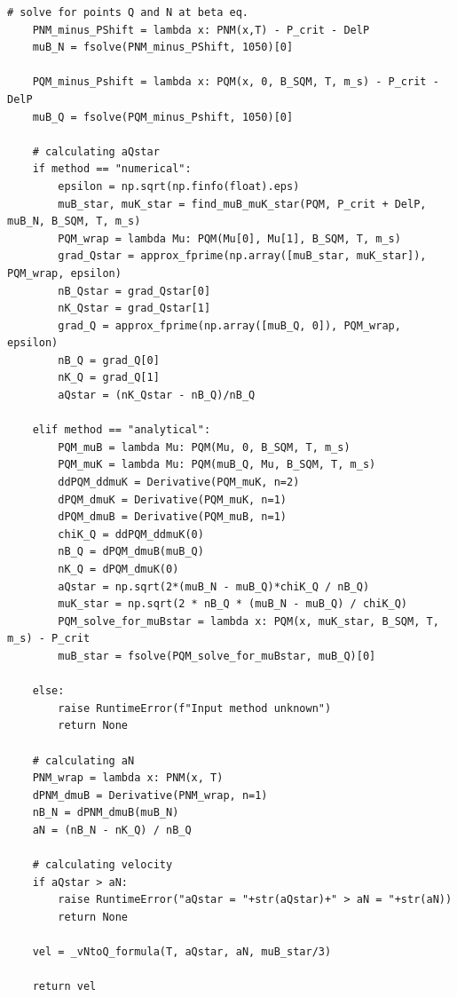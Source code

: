 \documentclass[12pt]{article}
\begin{document}
\begin{lstlisting}[style=mypython]
    # solve for points Q and N at beta eq.
    PNM_minus_PShift = lambda x: PNM(x,T) - P_crit - DelP
    muB_N = fsolve(PNM_minus_PShift, 1050)[0]

    PQM_minus_Pshift = lambda x: PQM(x, 0, B_SQM, T, m_s) - P_crit - DelP
    muB_Q = fsolve(PQM_minus_Pshift, 1050)[0]

    # calculating aQstar
    if method == "numerical":
        epsilon = np.sqrt(np.finfo(float).eps)
        muB_star, muK_star = find_muB_muK_star(PQM, P_crit + DelP, muB_N, B_SQM, T, m_s)
        PQM_wrap = lambda Mu: PQM(Mu[0], Mu[1], B_SQM, T, m_s)
        grad_Qstar = approx_fprime(np.array([muB_star, muK_star]), PQM_wrap, epsilon)
        nB_Qstar = grad_Qstar[0]
        nK_Qstar = grad_Qstar[1]
        grad_Q = approx_fprime(np.array([muB_Q, 0]), PQM_wrap, epsilon)
        nB_Q = grad_Q[0]
        nK_Q = grad_Q[1]
        aQstar = (nK_Qstar - nB_Q)/nB_Q  
 
    elif method == "analytical":
        PQM_muB = lambda Mu: PQM(Mu, 0, B_SQM, T, m_s)
        PQM_muK = lambda Mu: PQM(muB_Q, Mu, B_SQM, T, m_s)
        ddPQM_ddmuK = Derivative(PQM_muK, n=2)
        dPQM_dmuK = Derivative(PQM_muK, n=1)
        dPQM_dmuB = Derivative(PQM_muB, n=1)
        chiK_Q = ddPQM_ddmuK(0)
        nB_Q = dPQM_dmuB(muB_Q)
        nK_Q = dPQM_dmuK(0)
        aQstar = np.sqrt(2*(muB_N - muB_Q)*chiK_Q / nB_Q)
        muK_star = np.sqrt(2 * nB_Q * (muB_N - muB_Q) / chiK_Q)
        PQM_solve_for_muBstar = lambda x: PQM(x, muK_star, B_SQM, T, m_s) - P_crit
        muB_star = fsolve(PQM_solve_for_muBstar, muB_Q)[0]

    else:
        raise RuntimeError(f"Input method unknown")
        return None

    # calculating aN
    PNM_wrap = lambda x: PNM(x, T)
    dPNM_dmuB = Derivative(PNM_wrap, n=1)
    nB_N = dPNM_dmuB(muB_N)
    aN = (nB_N - nK_Q) / nB_Q   

    # calculating velocity
    if aQstar > aN:
        raise RuntimeError("aQstar = "+str(aQstar)+" > aN = "+str(aN))
        return None

    vel = _vNtoQ_formula(T, aQstar, aN, muB_star/3)

    return vel
\end{lstlisting}
\end{document}
